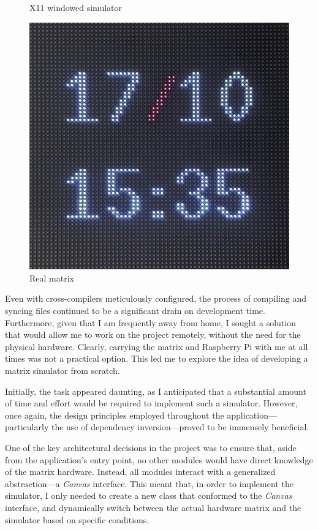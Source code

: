 \begin{figure}[h]
\begin{minipage}[b]{0.32\textwidth}
        \caption*{X11 windowed simulator} 
    \end{minipage}
    \centering
    \begin{minipage}[b]{0.32\textwidth}
        \centering
        \includegraphics[width=\textwidth]{tesi/img/matrices/real.jpg}
        \caption*{Real matrix} 
    \end{minipage}
\end{figure}


Even with cross-compilers meticulously configured, the process of compiling and syncing files continued to be a significant drain on development time. Furthermore, given that I am frequently away from home, I sought a solution that would allow me to work on the project remotely, without the need for the physical hardware. Clearly, carrying the matrix and Raspberry Pi with me at all times was not a practical option. This led me to explore the idea of developing a matrix simulator from scratch.

Initially, the task appeared daunting, as I anticipated that a substantial amount of time and effort would be required to implement such a simulator. However, once again, the design principles employed throughout the application—particularly the use of dependency inversion—proved to be immensely beneficial.

One of the key architectural decisions in the project was to ensure that, aside from the application’s entry point, no other modules would have direct knowledge of the matrix hardware. Instead, all modules interact with a generalized abstraction—a \textit{Canvas} interface. This meant that, in order to implement the simulator, I only needed to create a new class that conformed to the \textit{Canvas} interface, and dynamically switch between the actual hardware matrix and the simulator based on specific conditions.


